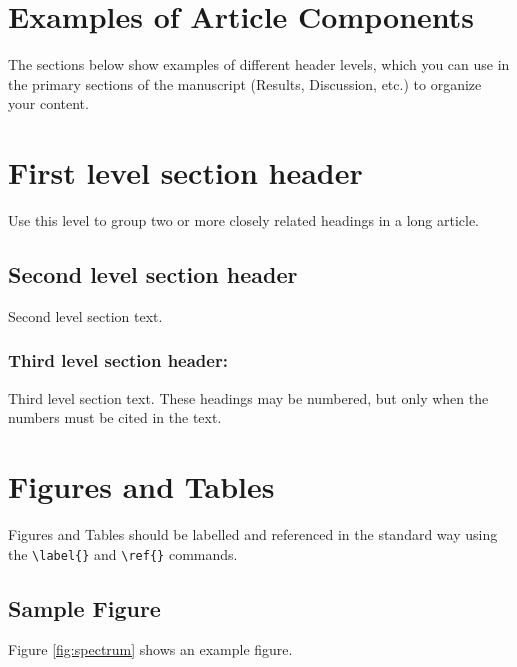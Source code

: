 \documentclass[9pt,twocolumn,twoside]{gsajnl}
\begin{document}
\section*{Examples of Article Components}
\label{sec:examples}

The sections below show examples of different header levels, which you can use in the primary sections of the manuscript (Results, Discussion, etc.) to organize your content.

\section*{First level section header}

Use this level to group two or more closely related headings in a long article.

\subsection*{Second level section header}

Second level section text.

\subsubsection*{Third level section header:}

Third level section text. These headings may be numbered, but only when the numbers must be cited in the text. 

\section*{Figures and Tables}

Figures and Tables should be labelled and referenced in the standard way using the \verb|\label{}| and \verb|\ref{}| commands.

\subsection*{Sample Figure}

Figure \ref{fig:spectrum} shows an example figure.
\end{document}
